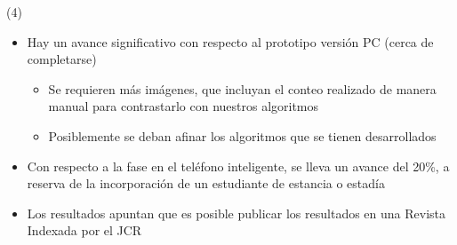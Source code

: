 \begin{frame}{\citetitle{\EntradaBibtex} (4)}

\begin{itemize}
\item Hay un avance significativo con respecto al prototipo versión PC (cerca de completarse)
\begin{itemize} 
\item Se requieren más imágenes, que incluyan el conteo realizado de manera manual para contrastarlo con nuestros algoritmos
\item Posiblemente se deban afinar los algoritmos que se tienen desarrollados
\end{itemize}
\item Con respecto a la fase en el teléfono inteligente, se lleva un avance del 20\%, a reserva de la incorporación de un estudiante de estancia o estadía
\item Los resultados apuntan que es posible publicar los resultados en una Revista Indexada por el JCR
\end{itemize}
\end{frame}




